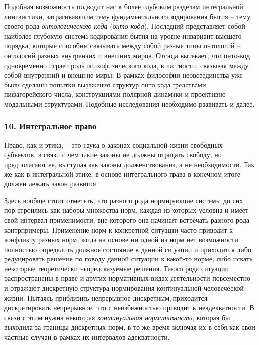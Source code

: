     Подобная возможность подводит нас к более глубоким разделам интегральной лингвистики, затрагивающим тему фундаментального кодирования бытия – тему своего рода \textit{онтологического кода} (\textit{онто-кода}). Последний представляет собой наиболее глубокую система кодирования бытия на уровне инвариант высшего порядка, которые способны связывать между собой разные типы онтологий – онтологий разных внутренних и внешних миров. Отсюда вытекает, что онто-код одновременно играет роль психофизического кода, в частности, связывая между собой внутренний и внешние миры. В рамках философии неовсеединства уже были сделаны попытки выражения структур онто-кода средствами пифагорейского числа, конструкциями полярной динамики и проективно-модальными структурами. Подобные исследования необходимо развивать и далее.

    \subsubsection*{10. Интегральное право}
    Право, как и этика, – это наука о законах социальной жизни свободных субъектов, в связи с чем такие законы не должны отрицать свободу, но предполагают ее, выступая как законы долженствования, а не необходимости. Так же как в интегральной этике, в основе интегрального права в конечном итоге должен лежать закон развития.

    Здесь вообще стоит отметить, что разного рода нормирующие системы до сих пор строились как наборы множества норм, каждая из которых условна и имеет свой интервал применимости, вне которого она начинает встречать разного рода контрпримеры. Применение норм к конкретной ситуации часто приводит к конфликту разных норм, когда на основе ни одной из норм нет возможности полностью определить должное состояние в данной ситуации и приходится либо редуцировать решение по поводу данной ситуации к какой-то норме, либо искать некоторые теоретически непредсказуемые решения. Такого рода ситуации распространены в праве и других нормативных видах деятельности повсеместно и отражают дискретную структура нормирования континуальной человеческой жизни. Пытаясь приблизить непрерывное дискретным, приходится дискретировать непрерывное, что с неизбежностью приводит к неадекватности. В связи с этим нужна некоторая \textit{континуальная нормативность}, которая бы выходила за границы дискретных норм, в то же время включая их в себя как свои частные случаи в рамках их интервалов адекватности.


